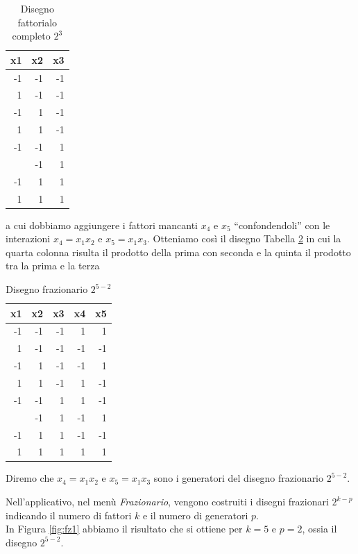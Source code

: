 \documentclass[
  11pt,
]{book}
\begin{document}
\begin{table}

\caption{\label{tab:fatt3}Disegno fattorialo completo $2^3$}
\centering
\begin{tabular}[t]{rrr}
\toprule
x1 & x2 & x3\\
\midrule
-1 & -1 & -1\\
1 & -1 & -1\\
-1 & 1 & -1\\
1 & 1 & -1\\
-1 & -1 & 1\\
\addlinespace
1 & -1 & 1\\
-1 & 1 & 1\\
1 & 1 & 1\\
\bottomrule
\end{tabular}
\end{table}

a cui dobbiamo aggiungere i fattori mancanti \(x_4\) e \(x_5\) ``confondendoli'' con le interazioni \(x_4=x_1x_2\) e \(x_5=x_1x_3\). Otteniamo così il disegno Tabella \ref{tab:fraz52} in cui la quarta colonna risulta il prodotto della prima con seconda e la quinta il prodotto tra la prima e la terza \newpage

\begin{table}

\caption{\label{tab:fraz52}Disegno frazionario $2^{5-2}$}
\centering
\begin{tabular}[t]{rrrrr}
\toprule
x1 & x2 & x3 & x4 & x5\\
\midrule
-1 & -1 & -1 & 1 & 1\\
1 & -1 & -1 & -1 & -1\\
-1 & 1 & -1 & -1 & 1\\
1 & 1 & -1 & 1 & -1\\
-1 & -1 & 1 & 1 & -1\\
\addlinespace
1 & -1 & 1 & -1 & 1\\
-1 & 1 & 1 & -1 & -1\\
1 & 1 & 1 & 1 & 1\\
\bottomrule
\end{tabular}
\end{table}

Diremo che \(x_4=x_1x_2\) e \(x_5=x_1x_3\) sono i generatori del disegno frazionario \(2^{5-2}\).

Nell'applicativo, nel menù \emph{Frazionario}, vengono costruiti i disegni frazionari \(2^{k-p}\) indicando il numero di fattori \(k\) e il numero di generatori \(p\).\\
In Figura \ref{fig:fz1} abbiamo il risultato che si ottiene per \(k=5\) e \(p=2\), ossia il disegno \(2^{5-2}\).
\end{document}
